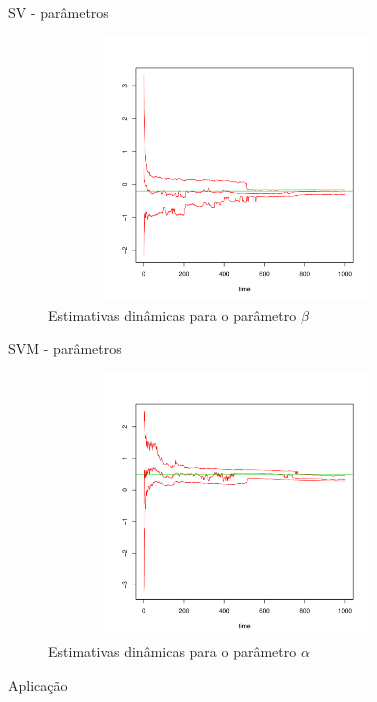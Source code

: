 \documentclass{beamer}
\begin{document}
\begin{frame}{SV - parâmetros}


 \begin{figure}
\begin{center}
 \includegraphics[height=7cm,width =10cm]{beta_1_01_02_05.pdf}
 \end{center}
\caption{Estimativas dinâmicas para o parâmetro $\beta$ } 
\end{figure}

 
 \end{frame}
 
 
 \begin{frame}{SVM - parâmetros}


 \begin{figure}
\begin{center}
 \includegraphics[height=7cm,width =10cm]{alpha_1_01_02_05.pdf}
 \end{center}
\caption{Estimativas dinâmicas para o parâmetro $\alpha$ } 
\end{figure}

 \end{frame}
 
 

 
\begin{frame}{}
    \begin{block}{ }
      \Huge  Aplicação
    \end{block}
\end{frame}
\end{document}
